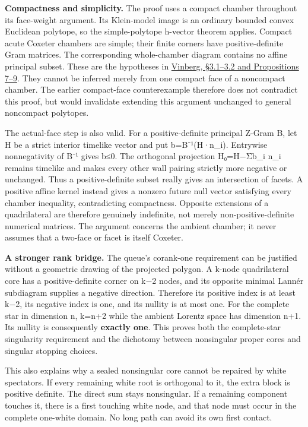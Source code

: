 \documentclass[
  10pt,
]{report}
\begin{document}
\textbf{Compactness and simplicity.} The proof uses a compact chamber
throughout its face-weight argument. Its Klein-model image is an
ordinary bounded convex Euclidean polytope, so the simple-polytope
h-vector theorem applies. Compact acute Coxeter chambers are simple;
their finite corners have positive-definite Gram matrices. The
corresponding whole-chamber diagram contains no affine principal subset.
These are the hypotheses in
\href{https://www.mathnet.ru/php/getFT.phtml?jrnid=mmo&option_lang=rus&paperid=444&what=fullt}{Vinberg,
§3.1--3.2 and Propositions 7--9}. They cannot be inferred merely from
one compact face of a noncompact chamber. The earlier compact-face
counterexample therefore does not contradict this proof, but would
invalidate extending this argument unchanged to general noncompact
polytopes.

The actual-face step is also valid. For a positive-definite principal
Z-Gram B, let H be a strict interior timelike vector and put
b=B⁻¹(H·n\_i). Entrywise nonnegativity of B⁻¹ gives b≤0. The orthogonal
projection H₀=H−Σb\_i n\_i remains timelike and makes every other wall
pairing strictly more negative or unchanged. Thus a positive-definite
subset really gives an intersection of facets. A positive affine kernel
instead gives a nonzero future null vector satisfying every chamber
inequality, contradicting compactness. Opposite extensions of a
quadrilateral are therefore genuinely indefinite, not merely
non-positive-definite numerical matrices. The argument concerns the
ambient chamber; it never assumes that a two-face or facet is itself
Coxeter.

\textbf{A stronger rank bridge.} The queue's corank-one requirement can
be justified without a geometric drawing of the projected polygon. A
k-node quadrilateral core has a positive-definite corner on k−2 nodes,
and its opposite minimal Lannér subdiagram supplies a negative
direction. Therefore its positive index is at least k−2, its negative
index is one, and its nullity is at most one. For the complete star in
dimension n, k=n+2 while the ambient Lorentz space has dimension n+1.
Its nullity is consequently \textbf{exactly one}. This proves both the
complete-star singularity requirement and the dichotomy between
nonsingular proper cores and singular stopping choices.

This also explains why a sealed nonsingular core cannot be repaired by
white spectators. If every remaining white root is orthogonal to it, the
extra block is positive definite. The direct sum stays nonsingular. If a
remaining component touches it, there is a first touching white node,
and that node must occur in the complete one-white domain. No long path
can avoid its own first contact.
\end{document}
